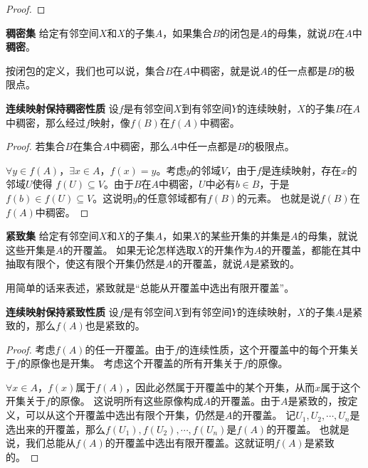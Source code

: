 \documentclass[12pt,UTF8]{ctexbook}
\begin{document}
\begin{appendix}
\begin{proof}
\end{proof}

\begin{df}{\textbf{稠密集}}
    给定有邻空间$X$和$X$的子集$A$，如果集合$B$的闭包是$A$的母集，就说$B$在$A$中\textbf{稠密}。
\end{df}

按闭包的定义，我们也可以说，集合$B$在$A$中稠密，就是说$A$的任一点都是$B$的极限点。

\begin{tm}{\textbf{连续映射保持稠密性质}}
    设$f$是有邻空间$X$到有邻空间$Y$的连续映射，$X$的子集$B$在$A$中稠密，那么经过$f$映射，像$f(B)$在$f(A)$中稠密。
\end{tm}

\begin{proof}
    若集合$B$在集合$A$中稠密，那么$A$中任一点都是$B$的极限点。

    $\forall y\in f(A)$，$\exists x\in A$，$f(x) = y$。考虑$y$的邻域$V$，由于$f$是连续映射，存在$x$的邻域$U$使得
    $f(U)\subseteq V$。由于$B$在$A$中稠密，$U$中必有$b\in B$，于是$f(b)\in f(U) \subseteq V$。这说明$y$的任意邻域都有$f(B)$的元素。
    也就是说$f(B)$在$f(A)$中稠密。
\end{proof}

\begin{df}{\textbf{紧致集}}
    给定有邻空间$X$和$X$的子集$A$，如果$X$的某些开集的并集是$A$的母集，就说这些开集是$A$的开覆盖。
    如果无论怎样选取$X$的开集作为$A$的开覆盖，都能在其中抽取有限个，使这有限个开集仍然是$A$的开覆盖，就说$A$是紧致的。
\end{df}

用简单的话来表述，紧致就是“总能从开覆盖中选出有限开覆盖”。

\begin{tm}{\textbf{连续映射保持紧致性质}}
    设$f$是有邻空间$X$到有邻空间$Y$的连续映射，$X$的子集$A$是紧致的，那么$f(A)$也是紧致的。
\end{tm}

\begin{proof}
    考虑$f(A)$的任一开覆盖。由于$f$的连续性质，这个开覆盖中的每个开集关于$f$的原像也是开集。
    考虑这个开覆盖的所有开集关于$f$的原像。

    $\forall x\in A$，$f(x)$属于$f(A)$，因此必然属于开覆盖中的某个开集，从而$x$属于这个开集关于$f$的原像。
    这说明所有这些原像构成$A$的开覆盖。由于$A$是紧致的，按定义，可以从这个开覆盖中选出有限个开集，仍然是$A$的开覆盖。
    记$U_1, U_2, \cdots, U_n$是选出来的开覆盖，那么$f(U_1), f(U_2), \cdots , f(U_n)$是$f(A)$的开覆盖。
    也就是说，我们总能从$f(A)$的开覆盖中选出有限开覆盖。这就证明$f(A)$是紧致的。


\end{proof}
\end{appendix}
\end{document}
